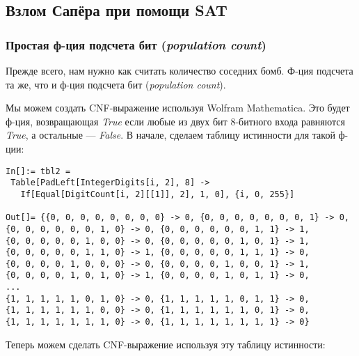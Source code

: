\subsection{Взлом Сапёра при помощи SAT}
\label{minesweeper_SAT}

\subsubsection{Простая ф-ция подсчета бит (\textit{population count})}

Прежде всего, нам нужно как считать количество соседних бомб.
Ф-ция подсчета та же, что и ф-ция подсчета бит (\textit{population count}).

Мы можем создать \ac{CNF}-выражение используя Wolfram Mathematica.
Это будет ф-ция, возвращающая \textit{True} если любые из двух бит 8-битного входа равняются \textit{True},
а остальные --- \textit{False}.
В начале, сделаем таблицу истинности для такой ф-ции:

\begin{lstlisting}
In[]:= tbl2 = 
 Table[PadLeft[IntegerDigits[i, 2], 8] -> 
   If[Equal[DigitCount[i, 2][[1]], 2], 1, 0], {i, 0, 255}]

Out[]= {{0, 0, 0, 0, 0, 0, 0, 0} -> 0, {0, 0, 0, 0, 0, 0, 0, 1} -> 0, 
{0, 0, 0, 0, 0, 0, 1, 0} -> 0, {0, 0, 0, 0, 0, 0, 1, 1} -> 1, 
{0, 0, 0, 0, 0, 1, 0, 0} -> 0, {0, 0, 0, 0, 0, 1, 0, 1} -> 1, 
{0, 0, 0, 0, 0, 1, 1, 0} -> 1, {0, 0, 0, 0, 0, 1, 1, 1} -> 0, 
{0, 0, 0, 0, 1, 0, 0, 0} -> 0, {0, 0, 0, 0, 1, 0, 0, 1} -> 1, 
{0, 0, 0, 0, 1, 0, 1, 0} -> 1, {0, 0, 0, 0, 1, 0, 1, 1} -> 0, 
...
{1, 1, 1, 1, 1, 0, 1, 0} -> 0, {1, 1, 1, 1, 1, 0, 1, 1} -> 0, 
{1, 1, 1, 1, 1, 1, 0, 0} -> 0, {1, 1, 1, 1, 1, 1, 0, 1} -> 0, 
{1, 1, 1, 1, 1, 1, 1, 0} -> 0, {1, 1, 1, 1, 1, 1, 1, 1} -> 0}
\end{lstlisting}

Теперь можем сделать \ac{CNF}-выражение используя эту таблицу истинности:

